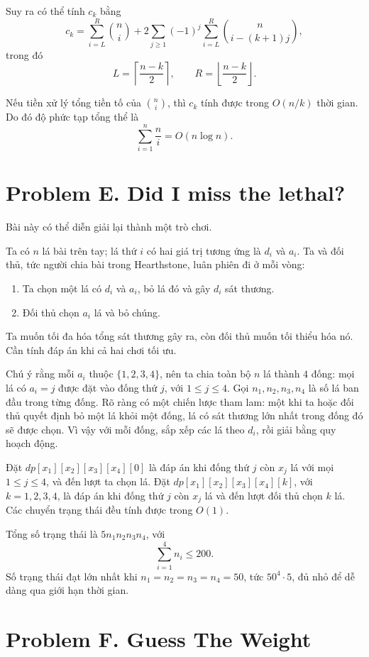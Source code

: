 \documentclass[11pt]{article}
\begin{document}
Suy ra có thể tính $c_k$ bằng
\[
  c_k=
  \sum_{i=L}^{R}\binom{n}{i}
  +2\sum_{j\ge 1}(-1)^j\sum_{i=L}^{R}
    \binom{n}{i-(k+1)j},
\]
trong đó
\[
  L=\left\lceil\frac{n-k}{2}\right\rceil,\qquad
  R=\left\lfloor\frac{n-k}{2}\right\rfloor.
\]

Nếu tiền xử lý tổng tiền tố của $\binom{n}{i}$, thì $c_k$ tính được trong
$O(n/k)$ thời gian. Do đó độ phức tạp tổng thể là
\[
  \sum_{i=1}^{n}\frac{n}{i}=O(n\log n).
\]

\section{Problem E. Did I miss the lethal?}

Bài này có thể diễn giải lại thành một trò chơi.

Ta có $n$ lá bài trên tay; lá thứ $i$ có hai giá trị tương ứng là $d_i$ và
$a_i$. Ta và đối thủ, tức người chia bài trong Hearthstone, luân phiên đi ở
mỗi vòng:
\begin{enumerate}
  \item Ta chọn một lá có $d_i$ và $a_i$, bỏ lá đó và gây $d_i$ sát thương.
  \item Đối thủ chọn $a_i$ lá và bỏ chúng.
\end{enumerate}
Ta muốn tối đa hóa tổng sát thương gây ra, còn đối thủ muốn tối thiểu hóa nó.
Cần tính đáp án khi cả hai chơi tối ưu.

Chú ý rằng mỗi $a_i$ thuộc $\{1,2,3,4\}$, nên ta chia toàn bộ $n$ lá thành
$4$ đống: mọi lá có $a_i=j$ được đặt vào đống thứ $j$, với $1\le j\le 4$.
Gọi $n_1,n_2,n_3,n_4$ là số lá ban đầu trong từng đống. Rõ ràng có một chiến
lược tham lam: một khi ta hoặc đối thủ quyết định bỏ một lá khỏi một đống,
lá có sát thương lớn nhất trong đống đó sẽ được chọn. Vì vậy với mỗi đống,
sắp xếp các lá theo $d_i$, rồi giải bằng quy hoạch động.

Đặt $dp[x_1][x_2][x_3][x_4][0]$ là đáp án khi đống thứ $j$ còn $x_j$ lá với
mọi $1\le j\le 4$, và đến lượt ta chọn lá. Đặt
$dp[x_1][x_2][x_3][x_4][k]$, với $k=1,2,3,4$, là đáp án khi đống thứ $j$ còn
$x_j$ lá và đến lượt đối thủ chọn $k$ lá. Các chuyển trạng thái đều tính được
trong $O(1)$.

Tổng số trạng thái là $5n_1n_2n_3n_4$, với
\[
  \sum_{i=1}^{4} n_i\le 200.
\]
Số trạng thái đạt lớn nhất khi
$n_1=n_2=n_3=n_4=50$, tức $50^4\cdot 5$, đủ nhỏ để dễ dàng qua giới hạn thời
gian.

\section{Problem F. Guess The Weight}
\end{document}
